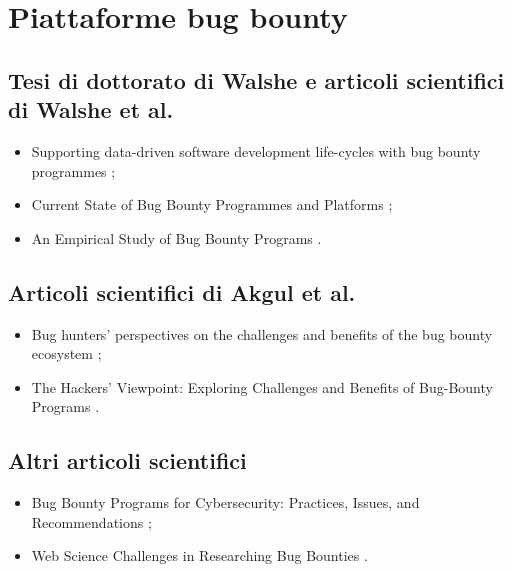 \section*{Piattaforme bug bounty}

\subsection*{Tesi di dottorato di Walshe e articoli scientifici di Walshe et al.}
\begin{itemize}

\item Supporting data-driven software development life-cycles with bug bounty programmes \cite{walshe2023bountythesis};

\item Current State of Bug Bounty Programmes and Platforms \cite{walshe2023bountythesis3};

\item An Empirical Study of Bug Bounty Programs \cite{walshe2020bountypaper}.

\end{itemize}

\subsection*{Articoli scientifici di Akgul et al.}
\begin{itemize}

\item Bug hunters' perspectives on the challenges and benefits of the bug bounty ecosystem \cite{akgul2023bughunters};

\item The Hackers' Viewpoint: Exploring Challenges and Benefits of Bug-Bounty Programs \cite{akgul2020bughunters}.

\end{itemize}

\subsection*{Altri articoli scientifici}
\begin{itemize}

\item Bug Bounty Programs for Cybersecurity: Practices, Issues, and Recommendations \cite{malladi2020bugbounty};

\item Web Science Challenges in Researching Bug Bounties \cite{fryer2017bugbounty}.

\end{itemize}


